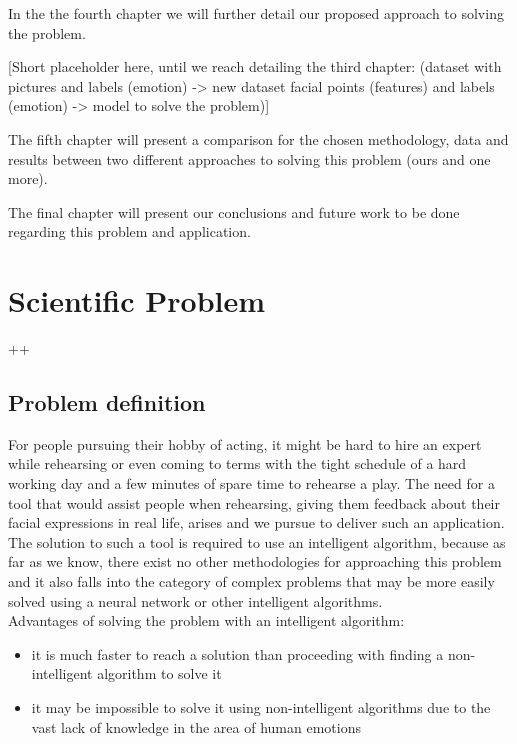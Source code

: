 \documentclass[runningheads,a4paper,11pt]{report}
\begin{document}
In the the fourth chapter we will further detail our proposed approach to solving the problem. 

[Short placeholder here, until we reach detailing the third chapter: (dataset with pictures and labels (emotion) -> new dataset facial points (features) and labels (emotion) -> model to solve the problem)]

The fifth chapter will present a comparison for the chosen methodology, data and results between two different approaches to solving this problem (ours and one more).

The final chapter will present our conclusions and future work to be done regarding this problem and application.

\chapter{Scientific Problem}
\label{section:scientificProblem}
++

\section{Problem definition}
\label{section:problemDefinition}

For people pursuing their hobby of acting, it might be hard to hire an expert while rehearsing or even coming to terms with the tight schedule of a hard working day and a few minutes of spare time to rehearse a play. The need for a tool that would assist people when rehearsing, giving them feedback about their facial expressions in real life, arises and we pursue to deliver such an application.\\
The solution to such a tool is required to use an intelligent algorithm, because as far as we know, there exist no other methodologies for approaching this problem and it also falls into the category of complex problems that may be more easily solved using a neural network or other intelligent algorithms.\\

Advantages of solving the problem with an intelligent algorithm:
\begin{itemize}
	\item it is much faster to reach a solution than proceeding with finding a non-intelligent algorithm to solve it
 	\item it may be impossible to solve it using non-intelligent algorithms due to the vast lack of knowledge in the area of human emotions
\end{itemize}
\end{document}
